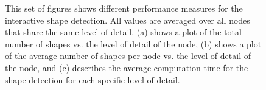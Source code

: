 \begin{figure}[p]
\centering
{}\par\medskip
{}\par\medskip   
{} 
\caption[Performance graphs of the interactive shape detection.]
{This set of figures shows different performance measures for the interactive shape detection. All values are averaged over all nodes that share the same level of detail. (a) shows a plot of the total number of shapes vs. the level of detail of the node, (b) shows a plot of the average number of shapes per node vs. the level of detail of the node, and (c) describes the average computation time for the shape detection for each specific level of detail. }
\label{fig:shape_detection_graphs}
\end{figure}



